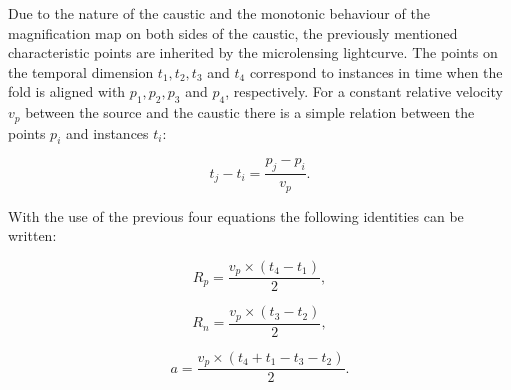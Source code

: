 \documentclass[usenatbib]{mn2e}
\begin{document}
Due to the nature of the caustic and the monotonic behaviour of the magnification map on both sides of the caustic, the previously 
mentioned characteristic points are inherited by the microlensing lightcurve. The points on the temporal dimension 
$t_1, t_2, t_3$ and $t_4$ correspond to instances in time when the fold is aligned with $p_1, p_2, p_3$ and $p_4$, respectively. 
For a constant relative velocity $v_p$ between the source and the caustic there is a simple relation between the points $p_i$ and instances $t_i$:

\begin{equation}
    t_j - t_i = \frac{p_j - p_i}{v_p}.
\end{equation}

With the use of the previous four equations the following identities can be written:

\begin{equation}
    R_p = \frac{v_p \times  \left( t_4 -t_1 \right)}{2}, 
\end{equation}

\begin{equation}
        R_n = \frac{v_p \times \left( t_3 -t_2 \right)}{2}, 
\end{equation}

\begin{equation}
        a = \frac{v_p \times \left( t_4 +t_1 - t_3 - t_2 \right)}{2}. 
\end{equation}
\end{document}
